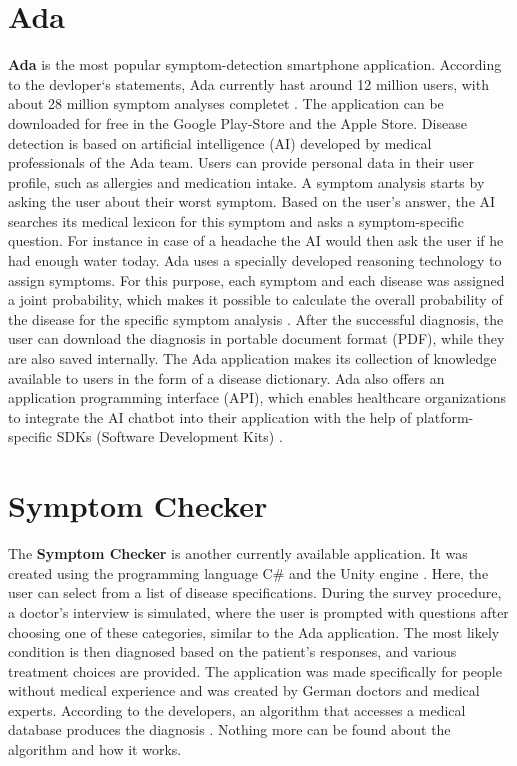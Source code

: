 \section{Ada} 
\textbf{Ada} is the most popular symptom-detection smartphone application. According to the devloper`s statements, Ada currently hast around 12 million users, with about 28 million symptom analyses completet \cite{.adaHOME}. The application can be downloaded for free in the Google Play-Store and the Apple Store. Disease detection is based on artificial intelligence (AI) developed by medical professionals of the Ada team. Users can provide personal data in their user profile, such as allergies and medication intake. A symptom analysis starts by asking the user about their worst symptom. Based on the user's answer, the AI searches its medical lexicon for this symptom and asks a symptom-specific question.
For instance in case of a headache the AI would then ask the user if he had enough water today. Ada uses a specially developed reasoning technology to assign symptoms. For this purpose, each symptom and each disease was assigned a joint probability, which makes it possible to calculate the overall probability of the disease for the specific symptom analysis \cite{.adaKI}. After the successful diagnosis, the user can download the diagnosis in portable document format (PDF), while they are also saved internally. The Ada application makes its collection of knowledge available to users in the form of a disease dictionary. Ada also offers an application programming interface (API), which enables healthcare organizations to integrate the AI chatbot into their application with the help of platform-specific SDKs (Software Development Kits)\cite{.adaFAQ} \cite{.adaDOCU}.

\section{Symptom Checker} 
The \textbf{Symptom Checker} is another currently available application. It was created using the programming language C\# and the Unity engine \cite{.symptomchecker}. Here, the user can select from a list of disease specifications. During the survey procedure, a doctor's interview is simulated, where the user is prompted with questions after choosing one of these categories, similar to the Ada application. The most likely condition is then diagnosed based on the patient's responses, and various treatment choices are provided. The application was made specifically for people without medical experience and was created by German doctors and medical experts. According to the developers, an algorithm that accesses a medical database produces the diagnosis \cite{.symptomchecker}. Nothing more can be found about the algorithm and how it works. 


